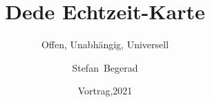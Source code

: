 


\usepackage{hyperref}

\usebackgroundtemplate

\usepackage{tikz}

\usepackage{listings}

\title[Dede]%
{Dede Echtzeit-Karte}

\subtitle{Offen, Unabhängig, Universell}

\author[Begerad]%
{Stefan~Begerad}

\date[2021]%
{Vortrag,2021}


